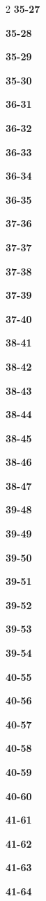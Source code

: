 \documentclass[10pt,a4paper]{article}
\begin{document}
\begin{multicols}{2}
\noindent\textbf{35-27}\ \par
\noindent\textbf{35-28}\ \par
\noindent\textbf{35-29}\ \par
\noindent\textbf{35-30}\ \par
\noindent\textbf{36-31}\ \par
\noindent\textbf{36-32}\ \par
\noindent\textbf{36-33}\ \par
\noindent\textbf{36-34}\ \par
\noindent\textbf{36-35}\ \par
\noindent\textbf{37-36}\ \par
\noindent\textbf{37-37}\ \par
\noindent\textbf{37-38}\ \par
\noindent\textbf{37-39}\ \par
\noindent\textbf{37-40}\ \par
\noindent\textbf{38-41}\ \par
\noindent\textbf{38-42}\ \par
\noindent\textbf{38-43}\ \par
\noindent\textbf{38-44}\ \par
\noindent\textbf{38-45}\ \par
\noindent\textbf{38-46}\ \par
\noindent\textbf{38-47}\ \par
\noindent\textbf{39-48}\ \par
\noindent\textbf{39-49}\ \par
\noindent\textbf{39-50}\ \par
\noindent\textbf{39-51}\ \par
\noindent\textbf{39-52}\ \par
\noindent\textbf{39-53}\ \par
\noindent\textbf{39-54}\ \par
\noindent\textbf{40-55}\ \par
\noindent\textbf{40-56}\ \par
\noindent\textbf{40-57}\ \par
\noindent\textbf{40-58}\ \par
\noindent\textbf{40-59}\ \par
\noindent\textbf{40-60}\ \par
\noindent\textbf{41-61}\ \par
\noindent\textbf{41-62}\ \par
\noindent\textbf{41-63}\ \par
\noindent\textbf{41-64}\ \par

\end{multicols}
\end{document}
